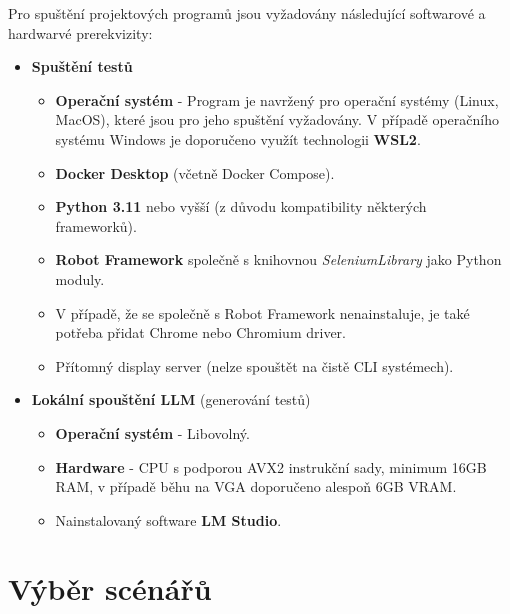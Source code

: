\documentclass[czech, ma, kiv, he, iso690numb, pdf, viewonly]{fasthesis}
\begin{document}
    Pro spuštění projektových programů jsou vyžadovány následující softwarové a hardwarvé prerekvizity:
    \begin{itemize}
        \item\textbf{Spuštění testů}
           \begin{itemize}
                \item \textbf{Operační systém} - Program je navržený pro  operační systémy (Linux, MacOS), které jsou pro jeho spuštění vyžadovány. V případě operačního systému Windows je doporučeno využít technologii \textbf{WSL2}.
                \item \textbf{Docker Desktop} (včetně Docker Compose).
                \item \textbf{Python 3.11} nebo vyšší (z důvodu kompatibility některých frameworků).
                \item \textbf{Robot Framework} společně s knihovnou \textit{SeleniumLibrary} jako Python moduly.
                \item V případě, že se společně s Robot Framework nenainstaluje, je také potřeba přidat Chrome nebo Chromium driver.
                \item Přítomný display server (nelze spouštět na čistě CLI systémech).
           \end{itemize} 
       \item\textbf{Lokální spouštění LLM} (generování testů)
           \begin{itemize}
                \item \textbf{Operační systém} - Libovolný.
                \item \textbf{Hardware} - CPU s podporou AVX2 instrukční sady, minimum 16GB RAM, v případě běhu na VGA doporučeno alespoň 6GB VRAM.
                \item Nainstalovaný software \textbf{LM Studio}.
           \end{itemize}
    \end{itemize}

    \section{Výběr scénářů} \label{sec:scenarios}
\end{document}
